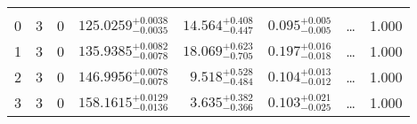 \begin{table*}[!]
\begin{tabular}{llcrrlrc}
\hline \\[-8pt]
0 & 3 & 0 & $    125.0259_{-      0.0035}^{+      0.0038}$ & $      14.564_{-       0.447}^{+       0.408}$ & $       0.095_{-       0.005}^{+       0.005}$ & \multicolumn{1}{c}{\dots} & 1.000\\[1pt]
1 & 3 & 0 & $    135.9385_{-      0.0078}^{+      0.0082}$ & $      18.069_{-       0.705}^{+       0.623}$ & $       0.197_{-       0.018}^{+       0.016}$ & \multicolumn{1}{c}{\dots} & 1.000 \\[1pt]
2 & 3 & 0 & $    146.9956_{-      0.0078}^{+      0.0078}$ & $       9.518_{-       0.484}^{+       0.528}$ & $       0.104_{-       0.012}^{+       0.013}$ & \multicolumn{1}{c}{\dots} & 1.000\\[1pt]
3 & 3 & 0 & $    158.1615_{-      0.0136}^{+      0.0129}$ & $       3.635_{-       0.366}^{+       0.382}$ & $       0.103_{-       0.025}^{+       0.021}$ & \multicolumn{1}{c}{\dots} & 1.000\\[1pt]
\hline
\end{tabular}
\end{table*}